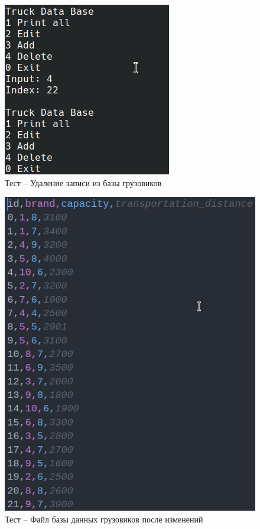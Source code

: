 \begin{figure}[H]
	\centering
	\includegraphics[width=0.8\linewidth]{photo/tests/admin/truck_db_delete}
	\caption{Тест -- Удаление записи из базы грузовиков}
	\label{truck_db_delete}
\end{figure}

\begin{figure}[H]
	\centering
	\includegraphics[width=0.7\linewidth]{photo/tests/admin/truck_db_state_init}
	\caption{Тест -- Файл базы данных грузовиков после изменений}
	\label{truck_db_state_init3}
\end{figure}

